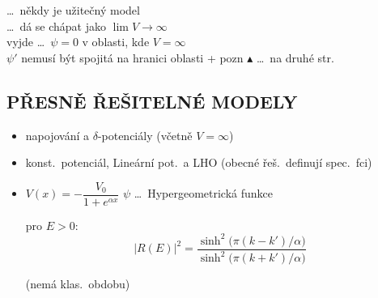  \dots\ někdy je užitečný model \\
\quad \dots\ dá se chápat jako $\lim V\to\infty$ \\
\quad vyjde \dots\ $\psi = 0$ v oblasti, kde $V = \infty$ \\
\quad\quad $\psi'$ nemusí být spojitá na hranici oblasti \quad + pozn $\blacktriangle$ \dots\ na druhé str.

\subsection*{PŘESNĚ ŘEŠITELNÉ MODELY}
\begin{itemize}
  \item napojování a $\delta$-potenciály (včetně $V = \infty$)
  \item konst.\ potenciál, Lineární pot.\ a LHO (obecné řeš.\ definují spec.\ fci)
  \item {} \quad $V(x) = -\dfrac{V_0}{1 + e^{\alpha x}}$ \quad $\psi$ \dots\ Hypergeometrická funkce

  \begin{minipage}{0.45\textwidth}
  \end{minipage}
  \begin{minipage}{0.5\textwidth}
  pro $E > 0$:
  \[
    |R(E)|^2 = \frac{\sinh^2\big(\pi(k - k')/\alpha\big)}{\sinh^2\big(\pi(k + k')/\alpha\big)}
  \]
  \end{minipage}

   (nemá klas.\ obdobu)
\end{itemize}

